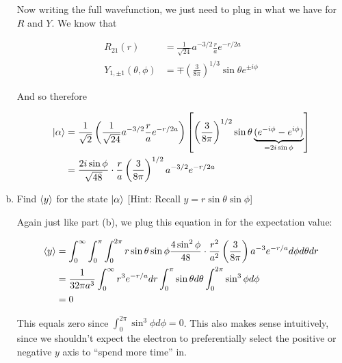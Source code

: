 \documentclass[10pt]{article}
\begin{document}
\begin{enumerate}[(a)]
\begin{solution}
            Now writing the full wavefunction, we just need to plug in what we have for $R$ and $Y$. We know that 

            \begin{align*}
                R_{21}(r) &= \frac{1}{\sqrt{24}} a^{-3/2} \frac{r}{a} e^{-r/2a}\\
                Y_{1, \pm 1}(\theta, \phi) &= \mp \left( \frac{3}{8\pi}\right)^{1/3} \sin \theta e^{\pm i\phi}
            \end{align*}

            And so therefore 

            \begin{align*}
                \ket{\alpha} &= \frac{1}{\sqrt{2}} \left( \frac{1}{\sqrt{24}} a^{-3/2} \frac{r}{a} e^{-r/2a}\right) \left[ \left( \frac{3}{8\pi}\right)^{1/2} \sin \theta \underbrace{(e^{-i\phi} - e^{i\phi})}_{= 2i \sin \phi}\right]\\
                &= \frac{2i \sin \phi}{\sqrt{48}} \cdot \frac ra \left(\frac{3}{8\pi}\right)^{1/2} a^{-3/2} e^{-r/2a}
            \end{align*}



        \end{solution}
        \item Find $\langle y \rangle$ for the state $\ket \alpha$ [Hint: Recall $y = r \sin \theta \sin \phi$]
        
        \begin{solution}
            Again just like part (b), we plug this equation in for the expectation value: 

            \begin{align*}
                \langle y \rangle &= \int_0^\infty \int_0^\pi \int_0^{2\pi} r \sin \theta \sin \phi \frac{4 \sin^2 \phi}{48} \cdot \frac{r^2}{a^2} \left( \frac{3}{8\pi}\right) a^{-3} e^{-r/a} d\phi d\theta dr\\
                &= \frac{1}{32 \pi a^3} \int_0^\infty r^3 e^{-r/a} dr \int_0^\pi \sin \theta d\theta \int_0^{2\pi} \sin^3\phi d\phi\\
                &= 0
            \end{align*}

            This equals zero since $\int_0^{2\pi} \sin^3 \phi d\phi = 0$. This also makes sense intuitively, since we shouldn't expect the electron to preferentially select the positive or negative $y$ axis to ``spend more time'' in. 
        \end{solution}
    \end{enumerate}
\end{document}
